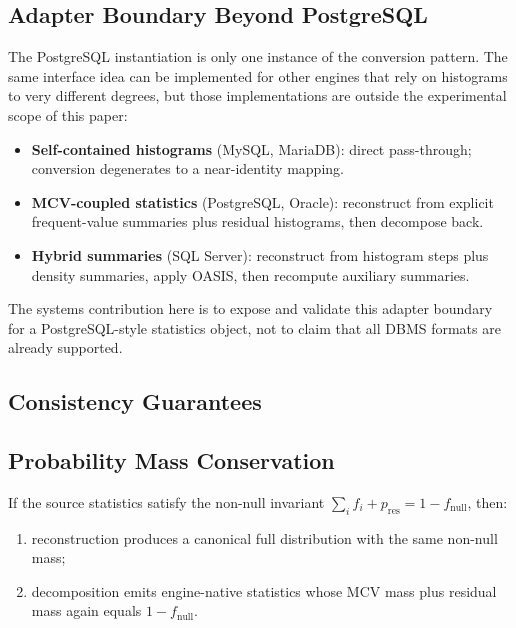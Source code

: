 \subsection{Adapter Boundary Beyond PostgreSQL}

The PostgreSQL instantiation is only one instance of the conversion pattern.
The same interface idea can be implemented for other engines that rely on
histograms to very different degrees, but those implementations are outside the
experimental scope of this paper:

\begin{itemize}
    \item \textbf{Self-contained histograms} (MySQL, MariaDB): direct pass-through; conversion degenerates to a near-identity mapping.
    \item \textbf{MCV-coupled statistics} (PostgreSQL, Oracle): reconstruct from explicit frequent-value summaries plus residual histograms, then decompose back.
    \item \textbf{Hybrid summaries} (SQL Server): reconstruct from histogram steps plus density summaries, apply OASIS, then recompute auxiliary summaries.
\end{itemize}

The systems contribution here is to expose and validate this adapter boundary
for a PostgreSQL-style statistics object, not to claim that all DBMS formats are
already supported.

\subsection{Consistency Guarantees}

\subsection{Probability Mass Conservation}

\begin{theorem}
If the source statistics satisfy the non-null invariant
$\sum_i f_i + p_{\mathrm{res}} = 1 - f_{\mathrm{null}}$, then:
\begin{enumerate}
    \item reconstruction produces a canonical full distribution with the same non-null mass;
    \item decomposition emits engine-native statistics whose MCV mass plus residual mass again equals $1 - f_{\mathrm{null}}$.
\end{enumerate}
\end{theorem}

